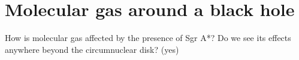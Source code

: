 \section{Molecular gas around a black hole}
How is molecular gas affected by the presence of Sgr A*?  Do we see its effects anywhere beyond the circumnuclear disk?  (yes)

